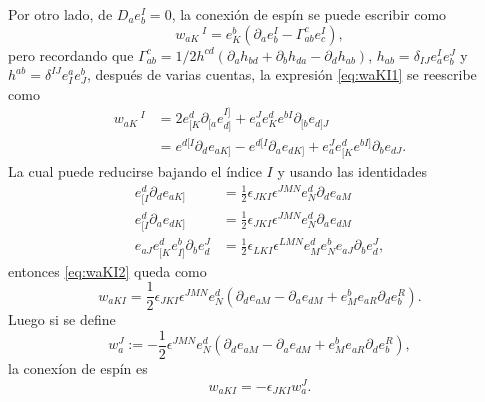 Por otro lado, de $D_{a} e^{I}_{b} = 0$, la conexi\'{o}n de esp\'{i}n se puede escribir como
%
\begin{equation}
\label{eq:waKI1}
w_{aK}\,^{I} = e^{b}_{K} (\partial_{a} e^{I}_{b} - \Gamma^{c}_{ab} e^{I}_{c}),
\end{equation}
%
pero recordando que $\Gamma^{c}_{ab} = 1/2 h^{cd} (\partial_{a} h_{bd} + \partial_{b} h_{da} - \partial_{d} h_{ab})$, $h_{ab} = \delta_{IJ} e^{I}_{a} e^{J}_{b}$ y $h^{ab} = \delta^{IJ} e^{a}_{I} e^{b}_{J}$, despu\'{e}s de varias cuentas, la expresi\'{o}n \eqref{eq:waKI1} se reescribe como
%
\begin{align}
\label{eq:waKI2}
w_{aK}\,^{I} & = 2 e^{d}_{[K} \partial_{[a} e^{I]}_{d]} + e^{J}_{a} e^{d}_{K} e^{bI} \partial_{[b} e_{d]J} \nonumber \\
& = e^{d[I} \partial_{d} e_{aK]} - e^{d[I} \partial_{a} e_{dK]} + e^{J}_{a} e^{d}_{[K} e^{bI]} \partial_{b} e_{dJ}.
\end{align}
%
La cual puede reducirse bajando el \'{i}ndice $I$ y usando las identidades
%
\begin{align*}
e^{d}_{[I} \partial_{d} e_{aK]} & = \frac{1}{2} \epsilon_{JKI} \epsilon^{JMN} e^{d}_{N} \partial_{d} e_{aM} \\
e^{d}_{[I} \partial_{a} e_{dK]} & = \frac{1}{2} \epsilon_{JKI} \epsilon^{JMN} e^{d}_{N} \partial_{a} e_{dM} \\
e_{aJ} e^{d}_{[K} e^{b}_{I]} \partial_{b} e^{J}_{d} & = \frac{1}{2} \epsilon_{LKI} \epsilon^{LMN} e^{d}_{M} e^{b}_{N} e_{aJ} \partial_{b} e^{J}_{d},
\end{align*}
%
entonces \eqref{eq:waKI2} queda como
%
\begin{equation}
w_{aKI} = \frac{1}{2} \epsilon_{JKI} \epsilon^{JMN} e^{d}_{N} (\partial_{d} e_{aM} - \partial_{a} e_{dM} + e^{b}_{M} e_{aR} \partial_{d} e^{R}_{b}).
\end{equation}
%
Luego si se define
%
\begin{equation}
w^{J}_{a} := -\frac{1}{2} \epsilon^{JMN} e^{d}_{N} (\partial_{d} e_{aM} - \partial_{a} e_{dM} + e^{b}_{M} e_{aR} \partial_{d} e^{R}_{b}),
\end{equation}
%
la conex\'{i}on de esp\'{i}n es
%
\begin{equation}
\label{eq:waKI}
w_{aKI} = -\epsilon_{JKI} w^{J}_{a}.
\end{equation}

